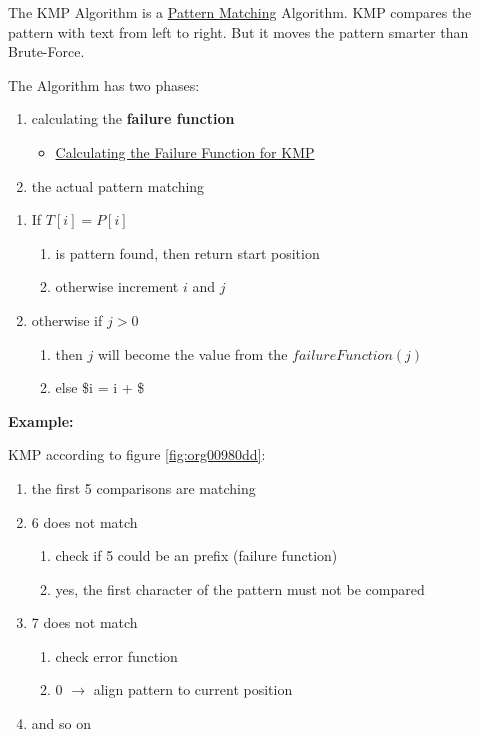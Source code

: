 \documentclass[11pt,twoside,twocolumn,landscape]{article}
\begin{document}
The KMP Algorithm is a \href{../../../roam/20211215163350-pattern_matching.org}{Pattern Matching} Algorithm.
KMP compares the pattern with text from left to right.
But it moves the pattern smarter than Brute-Force.

The Algorithm has two phases:
\begin{enumerate}
\item calculating the \textbf{failure function}
\begin{itemize}
\item \href{../../../roam/20211215171140-calculating_the_failure_function_for_kmp.org}{Calculating the Failure Function for KMP}
\end{itemize}
\item the actual pattern matching
\end{enumerate}


\begin{enumerate}
\item If \(T[i] = P[i]\)
\begin{enumerate}
\item is pattern found, then return start position
\item otherwise increment \(i\) and \(j\)
\end{enumerate}
\item otherwise if \(j > 0\) 
\begin{enumerate}
\item then \(j\) will become the value from the \(failureFunction(j)\)
\item else \$i = i + \$
\end{enumerate}
\end{enumerate}


\textbf{Example:}

KMP according to figure \ref{fig:org00980dd}:
\begin{enumerate}
\item the first 5 comparisons are matching
\item 6 does not match
\begin{enumerate}
\item check if 5 could be an prefix (failure function)
\item yes, the first character of the pattern must not be compared
\end{enumerate}
\item 7 does not match
\begin{enumerate}
\item check error function
\item 0 \(\rightarrow\) align pattern to current position
\end{enumerate}
\item and so on
\end{enumerate}
\end{document}

